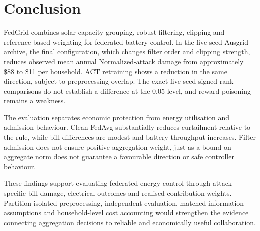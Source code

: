 \section{Conclusion}
FedGrid combines solar-capacity grouping, robust filtering, clipping and reference-based weighting for federated battery control. In the five-seed Ausgrid archive, the final configuration, which changes filter order and clipping strength, reduces observed mean annual Normalized-attack damage from approximately \$88 to \$11 per household. ACT retraining shows a reduction in the same direction, subject to preprocessing overlap. The exact five-seed signed-rank comparisons do not establish a difference at the 0.05 level, and reward poisoning remains a weakness.

The evaluation separates economic protection from energy utilisation and admission behaviour. Clean FedAvg substantially reduces curtailment relative to the rule, while bill differences are modest and battery throughput increases. Filter admission does not ensure positive aggregation weight, just as a bound on aggregate norm does not guarantee a favourable direction or safe controller behaviour.

These findings support evaluating federated energy control through attack-specific bill damage, electrical outcomes and realised contribution weights. Partition-isolated preprocessing, independent evaluation, matched information assumptions and household-level cost accounting would strengthen the evidence connecting aggregation decisions to reliable and economically useful collaboration.
